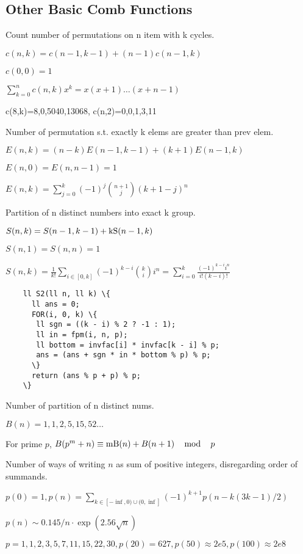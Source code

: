 \subsection{Other Basic Comb Functions}

Count number of permutations on n
item with k cycles.
\begin{tmindent}
  $c (n, k) = c (n - 1, k - 1) + (n - 1) c (n - 1, k)$
  
  $c (0, 0) = 1$
  
  $\sum_{k = 0}^n c (n, k) x^k = x (x + 1) \ldots (x + n - 1)$
  
  c(8,k)=8,0,5040,13068, c(n,2)=0,0,1,3,11
\end{tmindent}
Number of permutation s.t. exactly k elems are
greater than prev elem.
\begin{tmindent}
  $E (n, k) = (n - k) E (n - 1, k - 1) + (k + 1) E (n - 1, k)$
  
  $E (n, 0) = E (n, n - 1) = 1$
  
  $E (n, k) = \sum_{j = 0}^k (- 1)^j \binom{n + 1}{j} (k + 1 - j)^n$
\end{tmindent}
Partition of n distinct numbers
into exact k group.
\begin{tmindent}
  $S (n, k) = S (n - 1, k - 1) + \operatorname{kS} (n - 1, k)$
  
  $S (n, 1) = S (n, n) = 1$
  
  $S (n, k) = \frac{1}{k!} \sum_{i \in [0, k]} (- 1)^{k - i} \binom{k}{i} i^n
  = \sum_{i = 0}^k \frac{(- 1)^{k - i} i^n}{i! (k - i) !}$
  \begin{verbatim}
    ll S2(ll n, ll k) \{
      ll ans = 0;
      FOR(i, 0, k) \{
       ll sgn = ((k - i) % 2 ? -1 : 1);
       ll in = fpm(i, n, p);
       ll bottom = invfac[i] * invfac[k - i] % p;
       ans = (ans + sgn * in * bottom % p) % p;
      \}
      return (ans % p + p) % p;
    \}
  \end{verbatim}
  
\end{tmindent}
Number of partition of n distinct nums.
\begin{tmindent}
  $B (n) = 1, 1, 2, 5, 15, 52 \ldots$
  
  For prime $p$, $B (p^m + n) \equiv \operatorname{mB} (n) + B (n + 1) \quad
  \operatorname{mod} \quad p$
\end{tmindent}
Number of ways of writing $n$ as sum of
positive integers, disregarding order of summands.
\begin{tmindent}
  $p (0) = 1, p (n) = \sum_{k \in [- \inf, 0) \cup (0, \inf]} (- 1)^{k + 1} p
  (n - k (3 k - 1) / 2)$
  
  $p (n) \sim 0.145 / n \cdot \exp \left( 2.56 \sqrt{n} \right)$
  
  $p = 1, 1, 2, 3, 5, 7, 11, 15, 22, 30, p (20) = 627, p (50) \approx 2 e 5, p
  (100) \approx 2 e 8$
\end{tmindent}

